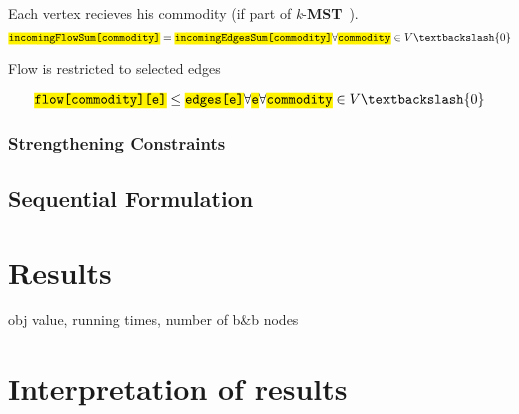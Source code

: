 \documentclass[,%
			paper=a4,%
			DIV12,
			liststotoc,
			bibtotoc,
			draft=false,%
			numbers=noendperiod
			]{scrartcl}
\newcommand{\mst}{\textbf{MST}}
\newcommand{\kmst}{\textit{k}-\mst}
\newcommand{\ilc}[1]{\hl{\texttt{#1}}} %
\begin{document}
Each vertex recieves his commodity (if part of \kmst\ ).
\begin{equation}\label{eq:mfcRec}
	 \ilc{incomingFlowSum[commodity]} = \ilc{incomingEdgesSum[commodity]}
\forall \ilc{commodity} \in V  \textbackslash \{0\}
\end{equation}

Flow is restricted to selected edges

\begin{equation}\label{eq:mfcFlowEdge}
 \ilc{flow[commodity][e]} \leq \ilc{edges[e]} \forall \ilc{e}
\forall \ilc{commodity} \in V  \textbackslash \{0\}
\end{equation}

\subsubsection{Strengthening Constraints}


\subsection{Sequential Formulation}

\section{Results}
obj value, running times, number of b\&b nodes

\section{Interpretation of results}
\end{document}
